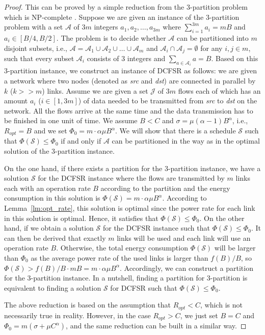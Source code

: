 \documentclass[10pt, conference, compsocconf]{IEEEtran}
\begin{document}
\begin{proof}
This can be proved by a simple reduction from the $3$-partition problem which is NP-complete \cite{Garey_Johnson-1990}. Suppose we are given an instance of the $3$-partition problem with a set $\mathcal{A}$ of $3m$ integers $a_1, a_2,\ldots, a_{3m}$ where $\sum_{i=1}^{3m} a_i = mB$ and $a_i \in [B/4, B/2]$. The problem is to decide whether $\mathcal{A}$ can be partitioned into $m$ disjoint subsets, i.e., $\mathcal{A} = \mathcal{A}_1 \cup \mathcal{A}_2 \cup \ldots \cup \mathcal{A}_m$ and $\mathcal{A}_i \cap \mathcal{A}_j = \emptyset$ for any $i, j \in m$, such that every subset $\mathcal{A}_i$ consists of $3$ integers and $\sum_{a \in \mathcal{A}_i} a = B$. Based on this $3$-partition instance, we construct an instance of DCFSR as follows: we are given a network where two nodes (denoted as \emph{src} and \emph{dst}) are connected in parallel by $k$ ($k >> m$) links. Assume we are given a set $\mathcal{J}$ of $3m$ flows each of which has an amount $a_i$ ($i \in [1,3m]$) of data needed to be transmitted from \emph{src} to \emph{dst} on the network. All the flows arrive at the same time and the data transmission has to be finished in one unit of time. We assume $B < C$ and $\sigma = \mu (\alpha-1) B^{\alpha}$, i.e., $R_{opt} = B$ and we set $\Phi_0 = m\cdot \alpha\mu B^{\alpha}$. We will show that there is a schedule $\mathcal{S}$ such that $\Phi(\mathcal{S}) \leq \Phi_0$ if and only if $\mathcal{A}$ can be partitioned in the way as in the optimal solution of the $3$-partition instance.

On the one hand, if there exists a partition for the $3$-partition instance, we have a solution $\mathcal{S}$ for the DCFSR instance where the flows are transmitted by $m$ links each with an operation rate $B$ according to the partition and the energy consumption in this solution is $\Phi(\mathcal{S}) = m\cdot \alpha\mu B^{\alpha}$. According to Lemma~\ref{lm:opt_rate}, this solution is optimal since the power rate for each link in this solution is optimal. Hence, it satisfies that $\Phi(\mathcal{S}) \leq \Phi_0$. On the other hand, if we obtain a solution $\mathcal{S}$ for the DCFSR instance such that $\Phi(\mathcal{S}) \leq \Phi_0$. It can then be derived that exactly $m$ links will be used and each link will use an operation rate $B$. Otherwise, the total energy consumption $\Phi(\mathcal{S})$ will be larger than $\Phi_0$ as the average power rate of the used links is larger than $f(B)/B$, so $\Phi(\mathcal{S}) > f(B)/B\cdot mB=m\cdot \alpha\mu B^{\alpha}$. Accordingly, we can construct a partition for the $3$-partition instance. In a nutshell, finding a partition for $3$-partition is equivalent to finding a solution $\mathcal{S}$ for DCFSR such that $\Phi(\mathcal{S}) \leq \Phi_0$. 

The above reduction is based on the assumption that $R_{opt} < C$, which is not necessarily true in reality. However, in the case $R_{opt} > C$, we just set $B=C$ and $\Phi_0 = m(\sigma + \mu C^{\alpha})$, and the same reduction can be built in a similar way.
\end{proof}
\end{document}
